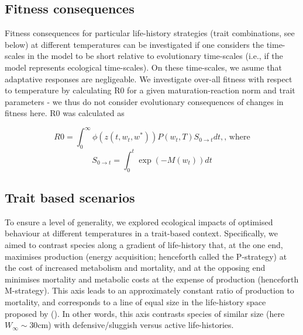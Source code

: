 \documentclass[a4paper, toc=index,abstract=true]{scrartcl}\usepackage[]{graphicx}\usepackage[]{color}
\begin{document}
\begin{spacing}{1.9}
\subsection{Fitness consequences}

Fitness consequences for particular life-history strategies (trait combinations, see below) at different temperatures can be investigated if one considers the time-scales in the model to be short relative to evolutionary time-scales (i.e., if the model represents ecological time-scales). On these time-scales, we asume that adaptative responses are negligeable. We investigate over-all fitness with respect to temperature by calculating R0 for a given maturation-reaction norm and trait parameters - we thus do not consider evolutionary consequences of changes in fitness here. R0 was calculated as 

$$R0 = \int_0^\infty \phi(z(t,w_t,w^*))P(w_t,T)S_{0 \rightarrow t} dt, \text{, where}$$
$$S_{0 \rightarrow t} = \int_0^t \exp(-M(w_t))dt$$

\subsection{Trait based scenarios}

To ensure a level of generality, we explored ecological impacts of optimised behaviour at different temperatures in a trait-based context. Specifically, we aimed to contrast species along a gradient of life-history that, at the one end, maximises production (energy acquisition; henceforth called the P-strategy) at the cost of increased metabolism and mortality, and at the opposing end minimises mortality and metabolic costs at the expense of production (henceforth M-strategy). This axis leads to an approximately constant ratio of production to mortality, and corresponds to a line of equal size in the life-history space proposed by \citeauthor{charnov_evolutionary_2013} (\citeyear{charnov_evolutionary_2013}). In other words, this axis contrasts species of similar size (here $W_{\infty}\sim 30$cm) with defensive/sluggish versus active life-histories.


\end{spacing}
\end{document}
